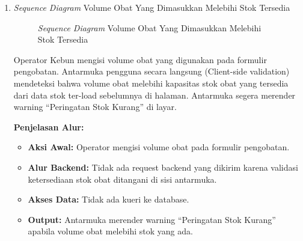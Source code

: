 \documentclass[a4paper,11pt]{article}
\begin{document}
\begin{enumerate}
    \textbf{Penjelasan Alur:}
    \begin{itemize}
        \item \textbf{Aksi Awal:} Operator mengisi formulir pengobatan dengan data tidak valid dan menekan tombol \textbf{Simpan}.
        \item \textbf{Alur Backend:} Request dikirim ke handler. Handler menolak request karena gagal validasi input.
        \item \textbf{Akses Data:} Request langsung dikembalikan oleh handler tanpa interaksi dengan database.
        \item \textbf{Output:} Handler merespons dengan \texttt{HTTP 400 Bad Request} dan antarmuka menyajikan pesan ``Pencatatan gagal, periksa kembali data yang dimasukkan''.
    \end{itemize}

    \item \textit{Sequence Diagram} Volume Obat Yang Dimasukkan Melebihi Stok Tersedia
    \begin{figure}[H]
        \centering
        \caption{\textit{Sequence Diagram} Volume Obat Yang Dimasukkan Melebihi Stok Tersedia}
        \label{fig:sd-pengobatan-stok-kurang}
    \end{figure}

    \hspace{1em} Operator Kebun mengisi volume obat yang digunakan pada formulir pengobatan. Antarmuka pengguna secara langsung (Client-side validation) mendeteksi bahwa volume obat melebihi kapasitas stok obat yang tersedia dari data stok ter-load sebelumnya di halaman. Antarmuka segera merender warning ``Peringatan Stok Kurang'' di layar.

    \textbf{Penjelasan Alur:}
    \begin{itemize}
        \item \textbf{Aksi Awal:} Operator mengisi volume obat pada formulir pengobatan.
        \item \textbf{Alur Backend:} Tidak ada request backend yang dikirim karena validasi ketersediaan stok obat ditangani di sisi antarmuka.
        \item \textbf{Akses Data:} Tidak ada kueri ke database.
        \item \textbf{Output:} Antarmuka merender warning ``Peringatan Stok Kurang'' apabila volume obat melebihi stok yang ada.
    \end{itemize}

\end{enumerate}
\end{document}
